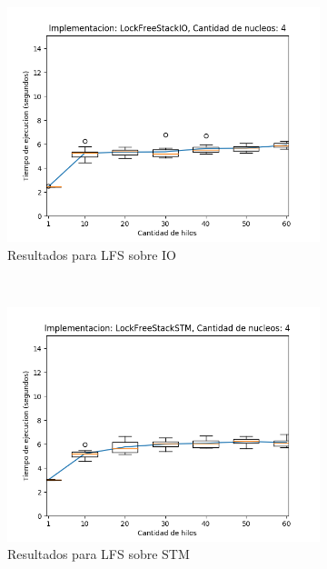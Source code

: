 \begin{appendices}
\begin{figure}[H]
    \begin{subfigure}[b]{0.49\textwidth}
        \includegraphics[width=\textwidth]{images/numberOfThreadsDist/plots/expLFSIO-4}
        \caption{Resultados para LFS sobre IO}
        \label{subfig:numberOfThreadsDist-lfsio-4}
    \end{subfigure}
    ~
    \begin{subfigure}[b]{0.49\textwidth}
        \includegraphics[width=\textwidth]{images/numberOfThreadsDist/plots/expLFSSTM-4}
        \caption{Resultados para LFS sobre STM}
        \label{subfig:numberOfThreadsDist-lfsstm-4}
    \end{subfigure}
    \begin{subfigure}[b]{0.49\textwidth}

\end{subfigure}
\end{figure}
\end{appendices}
